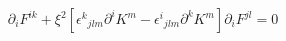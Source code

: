 \begin{equation}
{\partial}_{i}F^{ik}+{\xi}^{2}[{{\epsilon}^{k}}_{jlm}{\partial}^{i}K^{m}-{{\epsilon}^{i}}_{jlm}{\partial}^{k}K^{m}]{\partial}_{i}F^{jl}=0
\label{14}
\end{equation}

